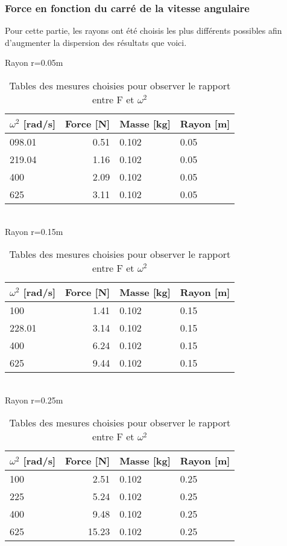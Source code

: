 \newpage
\clearpage
\subsubsection{Force en fonction du carré de la vitesse angulaire}

Pour cette partie, les rayons ont été choisis les plus différents possibles afin d'augmenter la dispersion des résultats  que voici.

\begin{table}[ht]
    \caption[Tables mesures vitesse angulaire force]{Tables des mesures choisies pour observer le rapport entre F et $\omega^2$}
    \centering

    Rayon r=0.05m\\[1px]
    \begin{tabular}{|l|r|l|l|}
	\hline
	$\omega^2$ [rad/s] & Force [N] & Masse [kg] & Rayon [m]\\
	\hline
	098.01	&0.51	&0.102	&0.05\\
	219.04	&1.16	&0.102	&0.05\\
	400	&2.09	&0.102	&0.05\\
	625	&3.11	&0.102	&0.05\\
	\hline
    \end{tabular}\\[5px]

    Rayon r=0.15m\\[1px]
    \begin{tabular}{|l|r|l|l|}
	\hline
	$\omega^2$ [rad/s] & Force [N] & Masse [kg] & Rayon [m]\\
	\hline
	100	&1.41	&0.102	&0.15\\
	228.01	&3.14	&0.102	&0.15\\
	400	&6.24	&0.102	&0.15\\
	625	&9.44	&0.102	&0.15\\
	\hline
    \end{tabular}\\[5px]

    Rayon r=0.25m\\[1px]
    \begin{tabular}{|l|r|l|l|}
	\hline
	$\omega^2$ [rad/s] & Force [N] & Masse [kg] & Rayon [m]\\
	\hline
	100	&2.51	&0.102	&0.25\\
	225	&5.24	&0.102	&0.25\\
	400	&9.48	&0.102	&0.25\\
	625	&15.23	&0.102	&0.25\\
	\hline
    \end{tabular}
\end{table}

